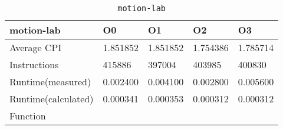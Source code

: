 \begin{table}[ht!]
\centering
\caption{\texttt{motion-lab}}
\label{tab:motion-lab}
\begin{tabular}{|l|l|l|l|l|}
\hline
\textbf{motion-lab}	&	\textbf{O0}	&	\textbf{O1}	&	\textbf{O2}	&	\textbf{O3}	\\\hline\hline
Average CPI	&	1.851852	&	1.851852	&	1.754386	&	1.785714	\\\hline
Instructions	&	415886	&	397004	&	403985	&	400830	\\\hline
Runtime(measured)	&	0.002400	&	0.004100	&	0.002800	&	0.005600	\\\hline
Runtime(calculated)	&	0.000341	&	0.000353	&	0.000312	&	0.000312	\\\hline
Function	&		&		&		&		\\\hline
\end{tabular}
\end{table}
